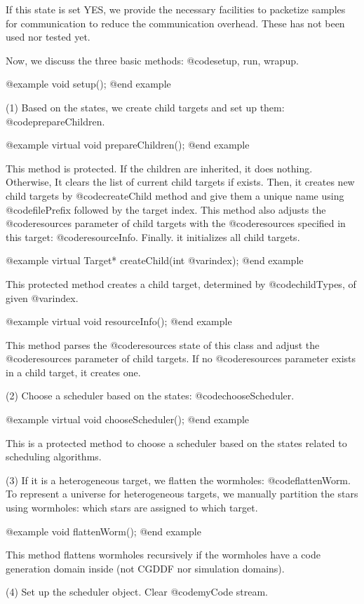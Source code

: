 If this state is set YES, we provide the necessary facilities to packetize
samples for communication to reduce the communication overhead. These
has not been used nor tested yet.

Now, we discuss the three basic methods: @code{setup, run, wrapup}.

@example
void setup();
@end example

(1) Based on the states, we create child targets and set up them:
@code{prepareChildren}.

@example
virtual void prepareChildren();
@end example

This method is protected. If the children are inherited, it does nothing.
Otherwise, It clears the list of current child targets if exists. Then,
it creates new child targets by @code{createChild} method and give them
a unique name using @code{filePrefix} followed by the target index.
This method also adjusts the @code{resources} parameter of child targets
with the @code{resources} specified in this target: @code{resourceInfo}.
Finally. it initializes all child targets.

@example
virtual Target* createChild(int @var{index});
@end example

This protected method creates a child target, determined by
@code{childTypes}, of given @var{index}.

@example
virtual void resourceInfo();
@end example

This method parses the @code{resources} state of this class and adjust the
@code{resources} parameter of child targets. If no @code{resources} parameter
exists in a child target, it creates one.

(2) Choose a scheduler based on the states: @code{chooseScheduler}.

@example
virtual void chooseScheduler();
@end example

This is a protected method to choose a scheduler based on the states
related to scheduling algorithms.

(3) If it is a heterogeneous target, we flatten the wormholes:
@code{flattenWorm}. To represent a universe for heterogeneous targets,
we manually partition the stars using wormholes: which stars are assigned
to which target. 

@example
void flattenWorm();
@end example

This method flattens wormholes recursively if the wormholes have
a code generation domain inside (not CGDDF nor simulation domains).

(4) Set up the scheduler object. Clear @code{myCode} stream.

